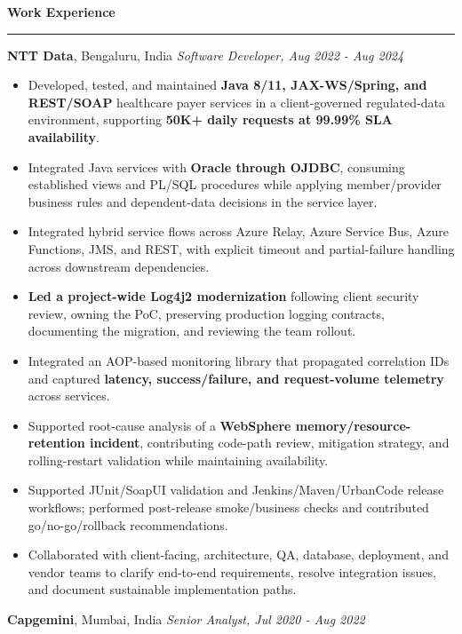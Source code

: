 \documentclass[11pt,letterpaper]{article}
\newcommand{\ressection}[1]{\Needspace{5\baselineskip}\vspace{8pt}\par\textbf{#1}\par\vspace{2pt}\hrule\vspace{5pt}}
\begin{document}
\ressection{Work Experience}
\textbf{NTT Data}, Bengaluru, India \hfill \textit{Software Developer, Aug 2022 - Aug 2024}
\begin{itemize}
  \item Developed, tested, and maintained \textbf{Java 8/11, JAX-WS/Spring, and REST/SOAP} healthcare payer services in a client-governed regulated-data environment, supporting \textbf{50K+ daily requests at 99.99\% SLA availability}.
  \item Integrated Java services with \textbf{Oracle through OJDBC}, consuming established views and PL/SQL procedures while applying member/provider business rules and dependent-data decisions in the service layer.
  \item Integrated hybrid service flows across Azure Relay, Azure Service Bus, Azure Functions, JMS, and REST, with explicit timeout and partial-failure handling across downstream dependencies.
  \item \textbf{Led a project-wide Log4j2 modernization} following client security review, owning the PoC, preserving production logging contracts, documenting the migration, and reviewing the team rollout.
  \item Integrated an AOP-based monitoring library that propagated correlation IDs and captured \textbf{latency, success/failure, and request-volume telemetry} across services.
  \item Supported root-cause analysis of a \textbf{WebSphere memory/resource-retention incident}, contributing code-path review, mitigation strategy, and rolling-restart validation while maintaining availability.
  \item Supported JUnit/SoapUI validation and Jenkins/Maven/UrbanCode release workflows; performed post-release smoke/business checks and contributed go/no-go/rollback recommendations.
  \item Collaborated with client-facing, architecture, QA, database, deployment, and vendor teams to clarify end-to-end requirements, resolve integration issues, and document sustainable implementation paths.
\end{itemize}
\textbf{Capgemini}, Mumbai, India \hfill \textit{Senior Analyst, Jul 2020 - Aug 2022}
\end{document}
